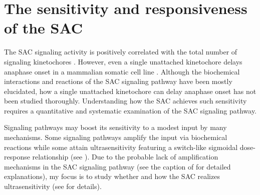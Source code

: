 \section{The sensitivity and responsiveness of the SAC}
\label{Sensitivity+Responsiveness}

The SAC signaling activity is positively correlated with the total number of signaling kinetochores \cite{RiederNormalProgression, Rheostat, Ablation}. However, even a single unattached kinetochore delays anaphase onset in a mammalian somatic cell line \cite{PtK1SingleUnattachedKT}. Although the biochemical interactions and reactions of the SAC signaling pathway have been mostly elucidated, how a single unattached kinetochore can delay anaphase onset has not been studied thoroughly. Understanding how the SAC achieves such sensitivity requires a quantitative and systematic examination of the SAC signaling pathway.

Signaling pathways may boost its sensitivity to a modest input by many mechanisms. Some signaling pathways amplify the input via biochemical reactions while some attain ultrasensitivity featuring a switch-like sigmoidal dose-response relationship (see ). Due to the probable lack of amplification mechanisms in the SAC signaling pathway (see the caption of  for detailed explanations), my focus is to study whether and how the SAC realizes ultrasensitivity (see  for details).

